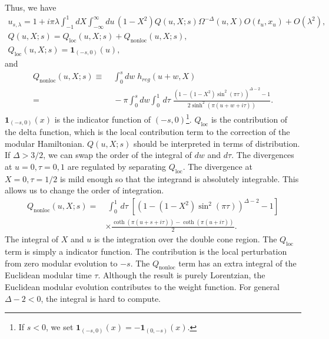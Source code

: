 \documentclass[a4paper,11pt]{article}
\theoremstyle{definition}
\newcommand{\KL}[1]{\textcolor{brown}{#1}}
\begin{document}
Thus, we have
\begin{gather}
    u_{s,\lambda} = 1 + i\pi \lambda \int_{-1}^1 dX \int_{-\infty}^{\infty} du \, (1-X^2) Q(u,X;s) \Omega^{-\Delta}(u,X) O(t_u,x_u) +O(\lambda^2),\\
    Q(u,X;s) = Q_{\text{loc}}(u,X;s) + Q_{\text{nonloc}}(u,X;s),\\
    Q_{\text{loc}}(u,X;s) =  \textbf{1}_{(-s,0)}(u),
\end{gather}
and 
\begin{align}
    Q_{\text{nonloc}}(u,X;s) \equiv&\;\int_0^s dw \; h_{reg}(u+w,X) \nonumber\\
    =&\; -\pi\int_0^s dw\int_0^1 \, d\tau  \;\frac{\left(1 - (1-X^2)\sin^2(\pi \tau)\right)^{\Delta-2} -1}{2\sinh^2(\pi (u+w+i\tau))}.
\end{align}
$\textbf{1}_{(-s,0)}(x)$ is the indicator function of $(-s,0)$\footnote{If $s < 0$, we set $\textbf{1}_{(-s,0)}(x) = - \textbf{1}_{(0,-s)}(x)$.}. $Q_{\text{loc}}$ is the contribution of the delta function, which is the local contribution term to the correction of the modular Hamiltonian. $Q(u,X;s)$ should be interpreted in terms of distribution. If $\Delta > 3/2$, we can swap the order of the integral of $dw$ and $d\tau$. The divergences at $u = 0, \tau = 0 , 1$ are regulated by separating $Q_{\text{loc}}$. The divergence at $X=0, \tau = 1/2$ is mild enough so that the integrand is absolutely integrable. This allows us to change the order of integration. 
\begin{align}
    Q_{\text{nonloc}}(u,X;s) =&\; \int_0^1 \, d\tau \; \left[\left(1 - (1-X^2)\sin^2(\pi \tau)\right)^{\Delta-2} -1\right] \nonumber\\
    &\times\frac{\coth(\pi(u+s+i\tau)) - \coth(\pi(u+i\tau))}{2}.
\end{align}
The integral of $X$ and $u$ is the integration over the double cone region. The $Q_{\text{loc}}$ term is simply a indicator function. The contribution is the local perturbation from zero modular evolution to $-s$. The $Q_{\text{nonloc}}$ term has an extra integral of the Euclidean modular time $\tau$. Although the result is purely Lorentzian, the Euclidean modular evolution contributes to the weight function. For general $\Delta-2 < 0$, the integral is hard to compute.
\end{document}
